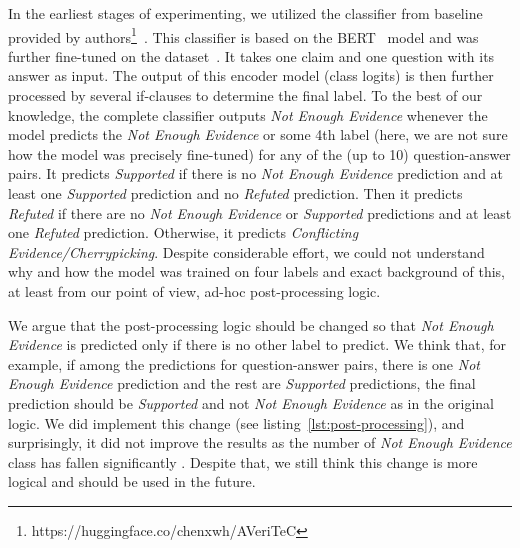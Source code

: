 In the earliest stages of experimenting, we utilized the classifier from baseline provided by authors\footnote{https://huggingface.co/chenxwh/AVeriTeC}~\cite{averitec2024}. This classifier is based on the BERT~\cite{devlin-etal-2019-bert} model and was further fine-tuned on the \averitec{}  dataset~\cite{averitec2024}. It takes one claim and one question with its answer as input. The output of this encoder model (class logits) is then further processed by several if-clauses to determine the final label. To the best of our knowledge, the complete classifier outputs \textit{Not Enough Evidence} whenever the model predicts the \textit{Not Enough Evidence} or some 4th label (here, we are not sure how the model was precisely fine-tuned) for any of the (up to 10) question-answer pairs. It predicts \textit{Supported} if there is no \textit{Not Enough Evidence} prediction and at least one \textit{Supported} prediction and no \textit{Refuted} prediction. Then it predicts \textit{Refuted} if there are no \textit{Not Enough Evidence} or \textit{Supported} predictions and at least one \textit{Refuted} prediction. Otherwise, it predicts \textit{Conflicting Evidence/Cherrypicking}. Despite considerable effort, we could not understand why and how the model was trained on four labels and exact background of this, at least from our point of view, ad-hoc post-processing logic.

We argue that the post-processing logic should be changed so that \textit{Not Enough Evidence} is predicted only if there is no other label to predict. We think that, for example, if among the predictions for question-answer pairs, there is one \textit{Not Enough Evidence} prediction and the rest are \textit{Supported} predictions, the final prediction should be \textit{Supported} and not \textit{Not Enough Evidence} as in the original logic. We did implement this change (see listing~\ref{lst:post-processing}), and surprisingly, it did not improve the results as the number of \textit{Not Enough Evidence} class has fallen significantly . Despite that, we still think this change is more logical and should be used in the future.

